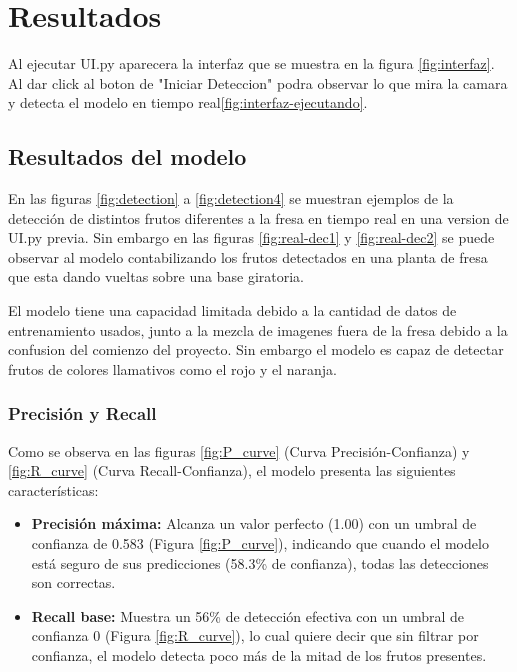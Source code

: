 \documentclass[conference]{IEEEtran}
\begin{document}
\section{Resultados}
Al ejecutar UI.py aparecera la interfaz que se muestra en la figura \ref{fig:interfaz}. Al dar click al boton de "Iniciar Deteccion" podra observar lo que mira la camara y detecta el modelo en tiempo real\ref{fig:interfaz-ejecutando}.


\subsection{Resultados del modelo}
En las figuras \ref{fig:detection} a \ref{fig:detection4} se muestran ejemplos de la detección de distintos frutos diferentes a la fresa en tiempo real en una version de UI.py previa. Sin embargo en las figuras \ref{fig:real-dec1} y \ref{fig:real-dec2} se puede observar al modelo contabilizando los frutos detectados en una planta de fresa que esta dando vueltas sobre una base giratoria.

El modelo tiene una capacidad limitada debido a la cantidad de datos de entrenamiento usados, junto a la mezcla de imagenes fuera de la fresa debido a la confusion del comienzo del proyecto. Sin embargo el modelo es capaz de detectar frutos de colores llamativos como el rojo y el naranja. 

\subsubsection{Precisión y Recall}
Como se observa en las figuras \ref{fig:P_curve} (Curva Precisión-Confianza) y \ref{fig:R_curve} (Curva Recall-Confianza), el modelo presenta las siguientes características:

\begin{itemize}
\item \textbf{Precisión máxima:} Alcanza un valor perfecto (1.00) con un umbral de confianza de 0.583 (Figura \ref{fig:P_curve}), indicando que cuando el modelo está seguro de sus predicciones (58.3\% de confianza), todas las detecciones son correctas.
\item \textbf{Recall base:} Muestra un 56\% de detección efectiva con un umbral de confianza 0 (Figura \ref{fig:R_curve}), lo cual quiere decir que sin filtrar por confianza, el modelo detecta poco más de la mitad de los frutos presentes.
\end{itemize}
\end{document}

